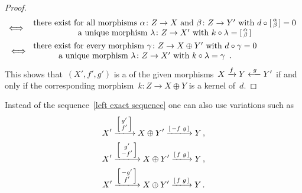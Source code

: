 \begin{proof}
\begin{align*}
    \iff{}& \begin{tabular}{c}
              there exist for all morphisms
              $\alpha \colon Z \to X$ and~$\beta \colon Z \to Y'$ with~$d \circ \begin{bsmallmatrix} \alpha \\ \beta \end{bsmallmatrix} = 0$ \\
              a unique morphism~$\lambda \colon Z \to X'$ with~$k \circ \lambda = \begin{bsmallmatrix} \alpha \\ \beta \end{bsmallmatrix}$
            \end{tabular} \\
    \iff&{} \begin{tabular}{c}
              there exist for every morphism
              $\gamma \colon Z \to X \oplus Y'$ with~$d \circ \gamma = 0$ \\
              a unique morphism~$\lambda \colon Z \to X'$ with~$k \circ \lambda = \gamma$ \,.
            \end{tabular}
  \end{align*}
  This shows that~$(X', f', g')$ is a {\pb} of the given morphisms~$X \xto{f} Y \xfrom{g} Y'$ if and only if the corresponding morphism~$k \colon Z \to X \oplus Y$ is a kernel of~$d$.
\end{proof}

\begin{remark}
  \label{variation for pullback}
  Instead of the sequence~\eqref{left exact sequence} one can also use variations such as
  \begin{gather*}
      X'
    \xlongto{ \begin{bsmallmatrix} g' \\ f' \end{bsmallmatrix} }
      X \oplus Y'
    \xlongto{ \begin{bsmallmatrix} -f & g \end{bsmallmatrix} }
      Y \,,
  \\
      X'
    \xlongto{ \begin{bsmallmatrix} g' \\ -f' \end{bsmallmatrix} }
      X \oplus Y'
    \xlongto{ \begin{bsmallmatrix} f & g \end{bsmallmatrix} }
      Y \,,
  \\
      X'
    \xlongto{ \begin{bsmallmatrix} - g' \\ f' \end{bsmallmatrix} }
      X \oplus Y'
    \xlongto{ \begin{bsmallmatrix} f & g \end{bsmallmatrix} }
      Y \,.
  \end{gather*}
\end{remark}


